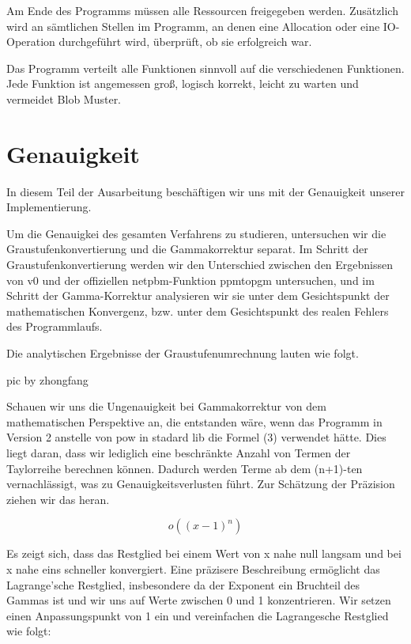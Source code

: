 \documentclass[course=erap]{aspdoc}
\begin{document}
\par
Am Ende des Programms müssen alle Ressourcen freigegeben werden. Zusätzlich wird an sämtlichen Stellen im Programm, an denen eine Allocation oder eine IO-Operation durchgeführt wird, überprüft, ob sie erfolgreich war.

\par
Das Programm verteilt alle Funktionen sinnvoll auf die verschiedenen Funktionen. Jede Funktion ist angemessen groß, logisch korrekt, leicht zu warten und vermeidet Blob Muster.

\section{Genauigkeit}


\par
In diesem Teil der Ausarbeitung beschäftigen wir uns mit der Genauigkeit unserer Implementierung.

\par
Um die Genauigkei des gesamten Verfahrens zu studieren, untersuchen wir die Graustufenkonvertierung und die Gammakorrektur separat. Im Schritt der Graustufenkonvertierung werden wir den Unterschied zwischen den Ergebnissen von v0 und der offiziellen netpbm-Funktion ppmtopgm untersuchen, und im Schritt der Gamma-Korrektur analysieren wir sie unter dem Gesichtspunkt der mathematischen Konvergenz, bzw. unter dem Gesichtspunkt des realen Fehlers des Programmlaufs.

\par
Die analytischen Ergebnisse der Graustufenumrechnung lauten wie folgt.

\par
pic by zhongfang

\par
Schauen wir uns die Ungenauigkeit bei Gammakorrektur von dem mathematischen Perspektive an, die entstanden wäre, wenn das Programm in Version 2 anstelle von pow in stadard lib die Formel (3) verwendet hätte. Dies liegt daran, dass wir lediglich eine beschränkte Anzahl von Termen der Taylorreihe berechnen können. Dadurch werden Terme ab dem (n+1)-ten vernachlässigt, was zu Genauigkeitsverlusten führt. Zur Schätzung der Präzision ziehen wir das \cite{mathematiknet2009taylorpolynome} heran.

\[
o\left((x-1)^n\right)
\]

\par
Es zeigt sich, dass das Restglied bei einem Wert von x nahe null langsam und bei x nahe eins schneller konvergiert. Eine präzisere Beschreibung ermöglicht das Lagrange'sche Restglied\cite{biancahoegel2021taylorformel}, insbesondere da der Exponent ein Bruchteil des Gammas ist und wir uns auf Werte zwischen 0 und 1 konzentrieren. Wir setzen einen Anpassungspunkt von 1 ein und vereinfachen die Lagrangesche Restglied wie folgt:
\end{document}
